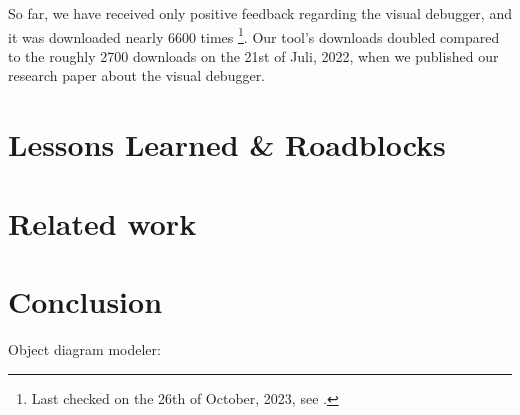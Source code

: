 \documentclass[sigconf]{acmart}
\begin{document}
So far, we have received only positive feedback regarding the visual debugger, and it was downloaded nearly 6600 times \footnote{Last checked on the 26th of October, 2023, see \cite{timkrauterVisualDebuggerIntelliJ2023}.}.
Our tool's downloads doubled compared to the roughly 2700 downloads on the 21st of Juli, 2022, when we published our research paper \cite{krauterVisualDebuggerTool2022} about the visual debugger.

\section{Lessons Learned \& Roadblocks} \label{sec:lessonsLearned}




\section{Related work} \label{sec:relatedWork}

\section{Conclusion} \label{sec:conclusion}

Object diagram modeler: \cite{timkrauterObjectDiagramModeler2023}




\end{document}
